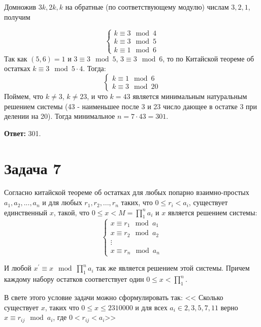 \documentclass{article}
\begin{document}
		  Домножив $3k, 2k, k$ на обратные (по соответствующему модулю) числам $3, 2, 1$, получим
		  
		  \begin{equation*} 
		  \begin{cases}
		  k \equiv 3 \mod 4 \\
		  k \equiv 3 \mod 5 \\
		  k \equiv 1 \mod 6
		  \end{cases}
		  \end{equation*}
		  Так как $(5, 6) = 1$ и  $3 \equiv 3 \mod 5$, $3\equiv 3 \mod 6$, то по Китайской теореме об остатках $k \equiv 3 \mod 5\cdot 4$. Тогда:
		  \begin{equation*} 
		  \begin{cases}
		  k \equiv 1 \mod 6 \\
		  k \equiv 3 \mod 20
		  \end{cases}
		  \end{equation*}
		  Поймем, что $k \ne 3$, $k \ne 23$, и что $k=43$ является минимальным натуральным решением системы (43 - наименьшее после 3 и 23 число дающее в остатке 3 при делении на 20). Тогда минимальное $n = 7 \cdot 43 = 301$.
		  
		  \textbf{Ответ:} 301.
		  
		  
		  \section {Задача 7}
			   Согласно китайской теореме об остатках для любых попарно взаимно-простых $a_1, a_2, ..., a_n$ и для любых $r_1, r_2, ..., r_n$ таких, что $0 \leqslant r_i < a_i$, существует единственный $x$, такой, что $0 \leqslant x < M = \prod_{1}^{n} a_i$ и $x$ является решением системы: 
			\begin{equation*} 
				   \begin{cases}
				   x \equiv r_1 \mod a_1 \\
				   x \equiv r_2 \mod a_2 \\
				   \vdots
				   \\
				   x \equiv r_n \mod a_n
                   \end{cases}
			\end{equation*}
			
			И любой $x^\prime \equiv x \mod \prod_{1}^{n} a_i$ так же является решением этой системы. Причем каждому набору остатков соответствует один $0 \leqslant x < \prod_{1}^{n}$.
			
			В свете этого условие задачи можно сформулировать так: << Сколько существует $x$, таких что $0 \leqslant x \leqslant 2310000$  и для всех $a_i \in {2,3,5,7,11}$ верно $x \equiv r_{ij} \mod a_i$, где $0 < r_{ij} < a_i$>>
			
\end{document}
